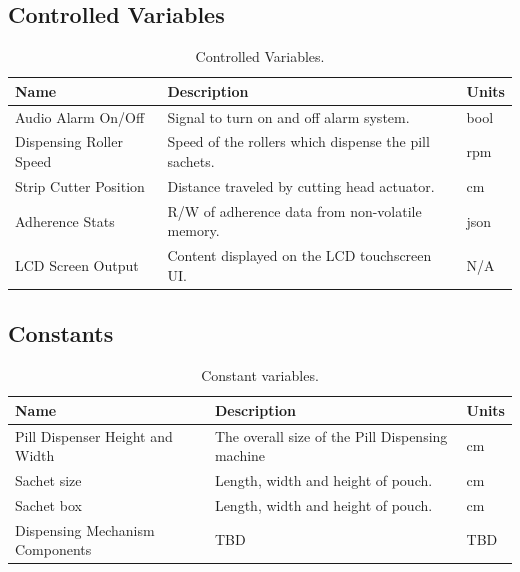\documentclass[12pt,titlepage]{article}
\begin{document}
\subsection{Controlled Variables}
\begin{table}[!htbp]
\begin{center}
\begin{adjustbox}{max width=\textwidth}
\small
\begin{tabular}{|p{}|p{}|p{}|}
 \hline
 \textbf{Name} & \textbf{Description} & \textbf{Units}\\
 \hline 
Audio Alarm On/Off & Signal to turn on and off alarm system. & bool\\
 \hline
Dispensing Roller Speed & Speed of the rollers which dispense the pill sachets. & rpm\\
 \hline
Strip Cutter Position & Distance traveled by cutting head actuator. & cm\\
 \hline
 Adherence Stats & R/W of adherence data from non-volatile memory. & json\\
 \hline
  LCD Screen Output & Content displayed on the LCD touchscreen UI. & N/A\\
 \hline 

\end{tabular}
\end{adjustbox}
\end{center}
\caption{Controlled Variables.}
\end{table}

\pagebreak

\subsection{Constants}

\begin{table}[ht!]
\begin{center}
\begin{adjustbox}{max width=\textwidth}
\small
\begin{tabular}{|p{}|p{}|p{}|}
 \hline
 \textbf{Name} & \textbf{Description} & \textbf{Units}\\
 \hline 
 Pill Dispenser Height and Width & The overall size of the Pill Dispensing machine & cm\\
 \hline
  Sachet size & Length, width and height of pouch. & cm\\
 \hline
   Sachet box & Length, width and height of pouch. & cm\\
 \hline
 Dispensing Mechanism Components & TBD & TBD \\
 \hline
\end{tabular}
\end{adjustbox}
\end{center}
\caption{Constant variables.}
\end{table}
\end{document}
